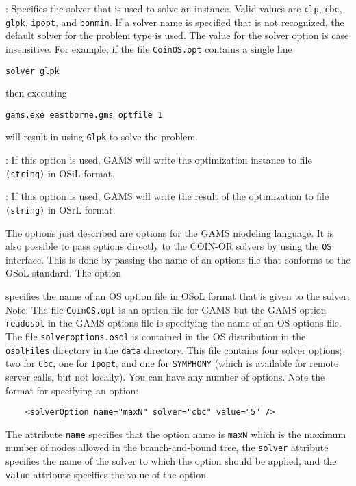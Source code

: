 \vskip 8pt
:   Specifies the solver that is used to solve an instance. 
Valid values are {\tt clp},  {\tt cbc}, {\tt glpk}, {\tt ipopt},  and {\tt bonmin}.  
If a solver name is specified that is not recognized, the default solver for the problem type is used.  
The value for the solver option is case insensitive. 
For example, if the file {\tt CoinOS.opt} contains a single line
\begin{verbatim}
solver glpk
\end{verbatim}
then executing
\begin{verbatim}
gams.exe eastborne.gms optfile 1
\end{verbatim}
will result in  using {\tt Glpk}  to solve the problem.   


\vskip 8pt
:  If this option is used, GAMS will write the optimization instance 
to file {\tt (string)} in    OSiL   format.
\vskip 8pt

\vskip 8pt
:  If this option is used, GAMS will write the result of the optimization 
to file {\tt (string)} in OSrL  format.
\vskip 8pt

The options just described are options for the GAMS modeling language.  
It is also possible to pass options directly to the COIN-OR solvers by using the {\tt OS} interface.
This is done by passing the name of an options file that conforms to the  OSoL  standard.  
The option

\vskip 8pt
  specifies the name of an OS option  file in OSoL format that is 
given to the solver.  Note: The file  {\tt CoinOS.opt} is an option  file for GAMS but the GAMS option 
{\tt readosol} in the GAMS options file  is specifying the name of an OS options file. 
\vskip 8pt
The file {\tt solveroptions.osol} is contained in the OS distribution in the {\tt osolFiles} directory   
in the {\tt data} directory. This file contains four solver options; two for {\tt Cbc}, one for {\tt Ipopt},
and one for {\tt SYMPHONY} (which is available for remote server calls, but not locally).  
You can have any number of options. Note the format for specifying an option:
\begin{verbatim}
    <solverOption name="maxN" solver="cbc" value="5" />
\end{verbatim}
The attribute {\tt name} specifies that the option name is {\tt maxN} which is the maximum number of nodes 
allowed in the branch-and-bound tree, the {\tt solver} attribute specifies the name of the solver to which
the option should be applied, and the {\tt value} attribute specifies the value of the option. 

